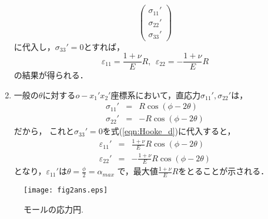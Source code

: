 \documentclass[10pt,a4j]{jarticle}
\begin{document}
\begin{enumerate}
\begin{equation}
		\left(
		\begin{array}{c}
			\sigma_{11}' \\
			\sigma_{22}' \\
			\sigma_{33}'
		\end{array}
		\right)
		\label{eqn:Hooke_d}
	\end{equation}
	に代入し，$\sigma_{33}'=0$とすれば，
	\begin{equation}
		\varepsilon_{11}=\frac{1+\nu}{E}R, \ \ 
		\varepsilon_{22}=-\frac{1+\nu}{E}R
	\end{equation}
	の結果が得られる．
\item
	一般の$\theta$に対する$o-x_1'x_2'$座標系において，直応力$\sigma_{11}',\sigma_{22}'$は，
	\begin{eqnarray}
		\sigma_{11}'&=&R\cos(\phi-2\theta) \\ 
		\sigma_{22}'&=&-R\cos(\phi-2\theta) 
	\end{eqnarray}
	だから，
	これと$\sigma_{33}'=0$を式(\ref{eqn:Hooke_d})に代入すると，
	\begin{eqnarray}
		\varepsilon_{11}'&=&\frac{1+\nu}{E}R\cos(\phi-2\theta) \\ 
		\varepsilon_{22}'&=&-\frac{1+\nu}{E}R\cos(\phi-2\theta) 
	\end{eqnarray}
	となり，$\varepsilon_{11}'$は$\theta=\frac{\phi}{2}=\alpha_{max}$
	で，最大値$\frac{1+\nu}{E}R$をとることが示される．
\end{enumerate}
\begin{figure}
	\begin{center}
	\texttt{[image: fig2ans.eps]} 
	\end{center}
	\caption{モールの応力円.} 
	\label{fig:fig2}
\end{figure}
\end{document}
